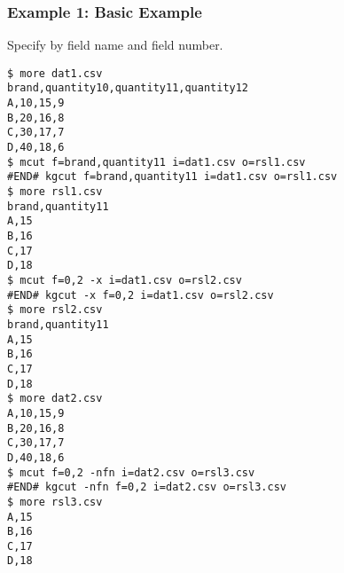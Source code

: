 \subsubsection*{Example 1: Basic Example}

Specify by field name and field number.


\begin{Verbatim}[baselinestretch=0.7,frame=single]
$ more dat1.csv
brand,quantity10,quantity11,quantity12
A,10,15,9
B,20,16,8
C,30,17,7
D,40,18,6
$ mcut f=brand,quantity11 i=dat1.csv o=rsl1.csv
#END# kgcut f=brand,quantity11 i=dat1.csv o=rsl1.csv
$ more rsl1.csv
brand,quantity11
A,15
B,16
C,17
D,18
$ mcut f=0,2 -x i=dat1.csv o=rsl2.csv
#END# kgcut -x f=0,2 i=dat1.csv o=rsl2.csv
$ more rsl2.csv
brand,quantity11
A,15
B,16
C,17
D,18
$ more dat2.csv
A,10,15,9
B,20,16,8
C,30,17,7
D,40,18,6
$ mcut f=0,2 -nfn i=dat2.csv o=rsl3.csv
#END# kgcut -nfn f=0,2 i=dat2.csv o=rsl3.csv
$ more rsl3.csv
A,15
B,16
C,17
D,18
\end{Verbatim}
